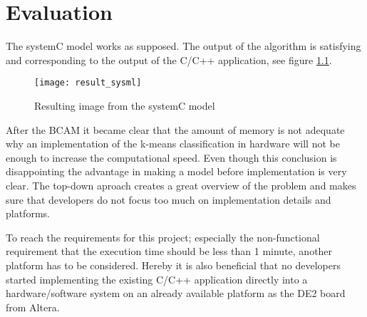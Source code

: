 \chapter{Evaluation}
The systemC model works as supposed. The output of the algorithm is satisfying and corresponding to the output of the C/C++ application, see figure \ref{fig:result_sysml}. 

\begin{figure}[H]
\centering
\texttt{[image: result\_sysml]}
\caption{Resulting image from the systemC model}
\label{fig:result_sysml}
\end{figure}

 
After the BCAM it became clear that the amount of memory is not adequate why an implementation of the k-means classification in hardware will not be enough to increase the computational speed. 
Even though this conclusion is disappointing the advantage in making a model before implementation is very clear. 
The top-down aproach creates a great overview of the problem and makes sure that developers do not focus too much on implementation details and platforms.

To reach the requirements for this project; especially the non-functional requirement that the execution time should be less than 1 minute, another platform has to be considered. 
Hereby it is also beneficial that no developers started implementing the existing C/C++ application directly into a hardware/software system on an already available platform as the DE2 board from Altera.
